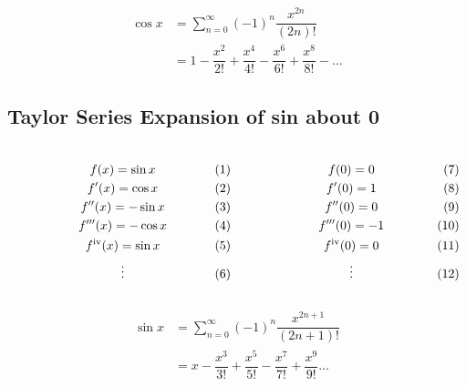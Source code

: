 \documentclass{article}
\begin{document}
\begin{align*}
	\cos x &= \sum_{n=0}^{\infty}(-1)^n\dfrac{x^{2n}}{(2n)!}\\
		   &= 1 - \dfrac{x^2}{2!}+\dfrac{x^4}{4!}-\dfrac{x^6}{6!}+\dfrac{x^8}{8!}-\dots
\end{align*}

\subsection{Taylor Series Expansion of sin about 0}

$\begin{array}{c c}
	\parbox[c]{0.5\textwidth}{
	\begin{gather*}
		f(x) = \sin x\\
		f'(x) = \cos x\\
		f''(x) = -\sin x\\
		f'''(x) = -\cos x\\
		f^{\text{iv}}(x) = \sin x\\
		\vdots
	\end{gather*}}
&
	\parbox[c]{0.5\textwidth}{
	\begin{gather*}
		f(0) = 0\\
		f'(0) = 1\\
		f''(0) = 0\\
		f'''(0) = -1\\
		f^{\text{iv}}(0) = 0\\
		\vdots
	\end{gather*}}
\end{array}$

\begin{align*}
	\sin x &= \sum_{n=0}^{\infty}(-1)^n\dfrac{x^{2n+1}}{(2n+1)!}\\
		   &= x - \dfrac{x^3}{3!} + \dfrac{x^5}{5!} - \dfrac{x^7}{7!} + \dfrac{x^9}{9!}\dots
\end{align*}
\end{document}
